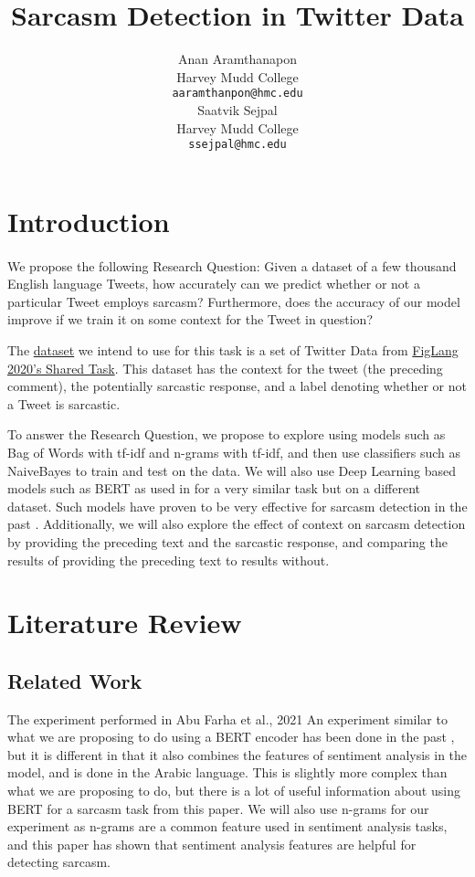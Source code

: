 \documentclass[11pt,a4paper]{article}
\title{Sarcasm Detection in Twitter Data}
\author{Anan Aramthanapon \\
  Harvey Mudd College \\
  \texttt{aaramthanpon@hmc.edu} \\\And
  Saatvik Sejpal \\
  Harvey Mudd College \\
  \texttt{ssejpal@hmc.edu} \\}
\date{}
\begin{document}
\maketitle

\section{Introduction}

\paragraph{} We propose the following Research Question: Given a dataset of a few thousand English language Tweets, how accurately can we predict whether or not a particular Tweet employs sarcasm?
Furthermore, does the accuracy of our model improve if we train it on some context for the Tweet in question?

The \href{https://github.com/EducationalTestingService/sarcasm/releases}{dataset} we intend to use for this task is a set of Twitter Data from \href{https://sites.google.com/view/figlang2020/}{FigLang 2020's Shared Task}. This dataset has the context for the tweet (the preceding comment), the potentially sarcastic response, and a label denoting whether or not a Tweet is sarcastic.

To answer the Research Question, we propose to explore using models such as Bag of Words with tf-idf and n-grams with tf-idf, and then use classifiers such as NaiveBayes to train and test on the data. 
We will also use Deep Learning based models such as BERT \cite{devlin2019bert} as used in \cite{Ghosh-Muresan} for a very similar task but on a different dataset. Such models have proven to be very effective for sarcasm detection in the past \cite{Ghosh-Muresan}.
Additionally, we will also explore the effect of context on sarcasm detection by providing the preceding text and the sarcastic response, and comparing the results of providing the preceding text to results without.


\section{Literature Review}
\subsection{Related Work}

The experiment performed in Abu Farha et al., 2021 An experiment similar to what we are proposing to do using a BERT encoder has been done in the past \cite{abu-farha}, but it is different in that it also combines the features of sentiment analysis in the model, and is done in the Arabic language. This is slightly more complex than what we are proposing to do, but there is a lot of useful information about using BERT for a sarcasm task from this paper. We will also use n-grams for our experiment as n-grams are a common feature used in sentiment analysis tasks, and this paper has shown that sentiment analysis features are helpful for detecting sarcasm.
\end{document}
